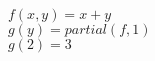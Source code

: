 \documentclass[varwidth,convert={density=2000,size=2000x,outext=.png}]{standalone}
\begin{document}
\begin{center}
$f(x,y)=x+y$\\
$g(y)=partial(f, 1)$\\
$g(2)=3$
\end{center}
\end{document}
